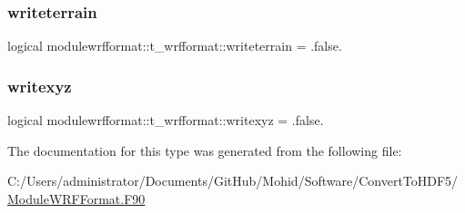 \subsubsection{\texorpdfstring{writeterrain}{writeterrain}}
{\footnotesize\ttfamily logical modulewrfformat\+::t\+\_\+wrfformat\+::writeterrain = .false.\hspace{0.3cm}{\ttfamily [private]}}

\mbox{\label{structmodulewrfformat_1_1t__wrfformat_a49c42dbf67ef7ef2ea562dd4fbb4957b}} 
\subsubsection{\texorpdfstring{writexyz}{writexyz}}
{\footnotesize\ttfamily logical modulewrfformat\+::t\+\_\+wrfformat\+::writexyz = .false.\hspace{0.3cm}{\ttfamily [private]}}



The documentation for this type was generated from the following file\+:\begin{DoxyCompactItemize}
\item 
C\+:/\+Users/administrator/\+Documents/\+Git\+Hub/\+Mohid/\+Software/\+Convert\+To\+H\+D\+F5/\mbox{\hyperlink{_module_w_r_f_format_8_f90}{Module\+W\+R\+F\+Format.\+F90}}\end{DoxyCompactItemize}
